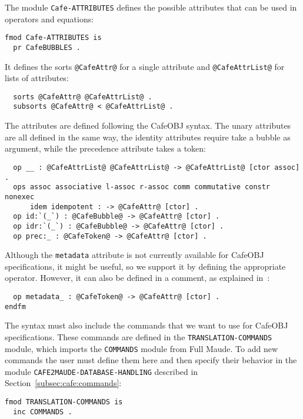The module \verb"Cafe-ATTRIBUTES" defines the possible attributes that can be used
in operators and equations:

{\codesize
\begin{verbatim}
fmod Cafe-ATTRIBUTES is
  pr CafeBUBBLES .
\end{verbatim}
}

It defines the sorts \verb"@CafeAttr@" for a single attribute and
\verb"@CafeAttrList@" for lists of attributes:

{\codesize
\begin{verbatim}
  sorts @CafeAttr@ @CafeAttrList@ .
  subsorts @CafeAttr@ < @CafeAttrList@ .
\end{verbatim}
}

The attributes are defined following the CafeOBJ syntax. The unary attributes
are all defined in the same way, the identity attributes require take a bubble as
argument, while the precedence attribute takes a token:

{\codesize
\begin{verbatim}
  op __ : @CafeAttrList@ @CafeAttrList@ -> @CafeAttrList@ [ctor assoc] .
  ops assoc associative l-assoc r-assoc comm commutative constr nonexec
      idem idempotent : -> @CafeAttr@ [ctor] .
  op id:`(_`) : @CafeBubble@ -> @CafeAttr@ [ctor] .
  op idr:`(_`) : @CafeBubble@ -> @CafeAttr@ [ctor] .
  op prec:_ : @CafeToken@ -> @CafeAttr@ [ctor] .
\end{verbatim}
}

Although the \verb"metadata" attribute is not currently available for CafeOBJ
specifications, it might be useful, so we support it by defining the appropriate
operator. However, it can also be defined in a comment, as explained
in~\cite{cafeOBJ2maudeUG}:

{\codesize
\begin{verbatim}
  op metadata_ : @CafeToken@ -> @CafeAttr@ [ctor] .
endfm
\end{verbatim}
}

The syntax must also include the commands that we want to use for CafeOBJ specifications.
These commands are defined in the \verb"TRANSLATION-COMMANDS" module, which imports the
\verb"COMMANDS" module from Full Maude. To add new commands the user must define them
here and then specify their behavior in the module \texttt{CAFE2MAUDE-DATABASE-HANDLING}
described in Section~\ref{subsec:cafe:commands}:

{\codesize
\begin{verbatim}
fmod TRANSLATION-COMMANDS is
  inc COMMANDS .
\end{verbatim}
}

